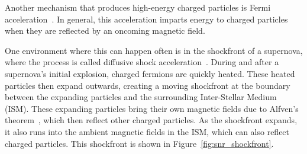 
  Another mechanism that produces high-energy charged particles is Fermi acceleration~\cite{fermi1949,highenergyelectron_snr}.
  In general, this acceleration imparts energy to charged particles when they are reflected by an oncoming magnetic field.
  
  One environment where this can happen often is in the shockfront of a supernova, where the process is called diffusive shock acceleration~\cite{dsa1,dsa2,dsa3,dsa4,dsa5}.
  During and after a supernova's initial explosion, charged fermions are quickly heated.
  These heated particles then expand outwards, creating a moving shockfront at the boundary between the expanding particles and the surrounding Inter-Stellar Medium (ISM).
  These expanding particles bring their own magnetic fields due to Alfven's theorem~\cite{alfven1,alfven2}, which then reflect other charged particles.
  As the shockfront expands, it also runs into the ambient magnetic fields in the ISM, which can also reflect charged particles.
  This shockfront is shown in Figure~\ref{fig:snr_shockfront}.

